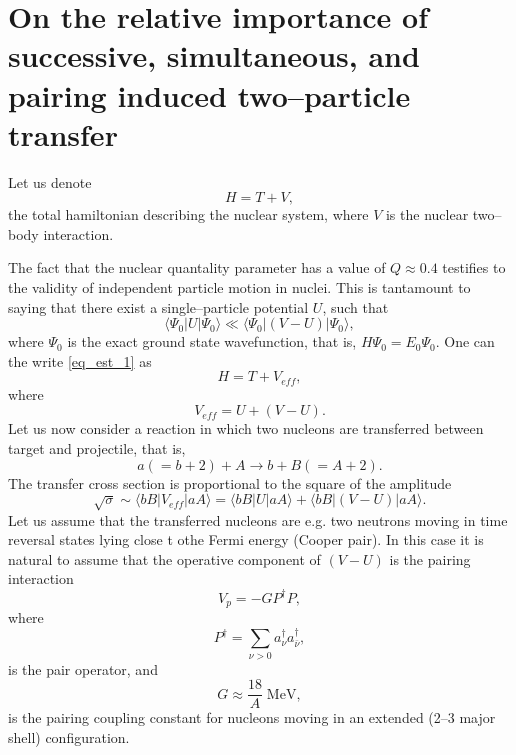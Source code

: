 \documentclass[a4paper,14pt]{article}
\begin{document}
\section{On the relative importance of successive, simultaneous, and pairing induced two--particle transfer}
Let us denote
\begin{equation}\label{eq_est_1}
    H=T+V,
\end{equation}
the total hamiltonian describing the nuclear system, where $V$ is the nuclear two--body interaction.


The fact that the nuclear quantality parameter has a value of $Q\approx 0.4$ testifies to the validity of independent particle motion in nuclei. This is tantamount to saying that there exist a single--particle potential $U$, such that
\begin{equation}\label{eq_est_2}
\langle \Psi_0 | U | \Psi_0 \rangle \ll \langle \Psi_0 |(V- U )| \Psi_0 \rangle,
\end{equation}
where $\Psi_0$ is the exact ground state wavefunction, that is, $H\Psi_0=E_0 \Psi_0$. One can the write \ref{eq_est_1} as
\begin{equation}\label{eq_est_3}
H=T+V_{eff},
\end{equation}
where
\begin{equation}\label{eq_est_4}
V_{eff}=U+(V-U).
\end{equation}
Let us now consider a reaction in which two nucleons are transferred between target and projectile, that is,
\begin{equation}\label{eq_est_5}
a(=b+2)+A\rightarrow b+B(=A+2).
\end{equation}
The transfer cross section is proportional to the square of the amplitude
\begin{equation}\label{eq_est_6}
\sqrt{\sigma}\sim \langle bB | V_{eff} | aA \rangle = \langle bB | U | aA \rangle + \langle bB | (V-U) | aA \rangle.
\end{equation}
Let us assume that the transferred nucleons are e.g. two neutrons moving in time reversal states lying close t othe Fermi energy (Cooper pair). In this case it is natural to assume that the operative component of $(V-U)$ is the pairing interaction
\begin{equation}\label{eq_est_7}
V_p=-GP^\dagger P,
\end{equation}
where
\begin{equation}\label{eq_est_8}
P^\dagger=\sum_{\nu>0}a_\nu^{\dagger}a_{\bar\nu}^{\dagger},
\end{equation}
is the pair operator, and
\begin{equation}\label{eq_est_9}
G\approx\frac{18}{A}\; \text{MeV},
\end{equation}
is the pairing coupling constant for nucleons moving in an extended (2--3 major shell) configuration.
\end{document}
